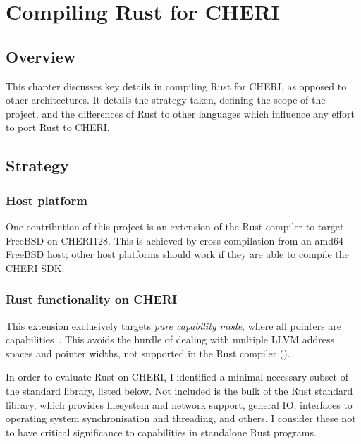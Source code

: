 \documentclass[dissertation.tex]{subfiles}
\begin{document}
\chapter{Compiling Rust for CHERI}
\label{ch:impl}


\section{Overview}

This chapter discusses key details in compiling Rust for CHERI, as
opposed to other architectures.
It details the strategy taken, defining the scope of the project, and
the differences of Rust to other languages which influence any effort to
port Rust to CHERI.


\section{Strategy}
\label{sec:impl-what}

\subsection{Host platform}
One contribution of this project is an extension of the Rust compiler to
target FreeBSD on CHERI128.
This is achieved by cross-compilation from an amd64 FreeBSD host; other
host platforms should work if they are able to compile the CHERI SDK.

\subsection{Rust functionality on CHERI}
This extension exclusively targets \emph{pure capability mode}, where
all pointers are capabilities~\cite{cheri-prog-guide}.
This avoids the hurdle of dealing with multiple LLVM address spaces and
pointer widths, not supported in the Rust compiler
().

In order to evaluate Rust on CHERI, I identified
a minimal necessary subset of the standard library, listed below.
Not included is the bulk of the Rust standard library, which provides
filesystem and network support, general IO, interfaces to operating
system synchronisation and threading, and others.
I consider these not to have critical significance to capabilities in
standalone Rust programs.
\end{document}
